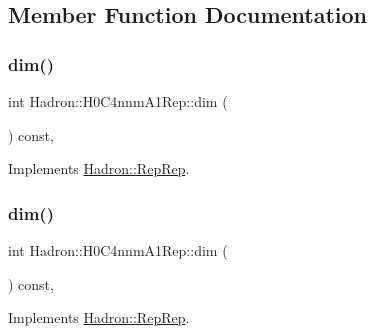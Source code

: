 \subsection{Member Function Documentation}
\mbox{\label{structHadron_1_1H0C4nnmA1Rep_a0457553b469cd5842e489112270a1d05}} 
\subsubsection{\texorpdfstring{dim()}{dim()}\hspace{0.1cm}{\footnotesize\ttfamily [1/5]}}
{\footnotesize\ttfamily int Hadron\+::\+H0\+C4nnm\+A1\+Rep\+::dim (\begin{DoxyParamCaption}{ }\end{DoxyParamCaption}) const\hspace{0.3cm}{\ttfamily [inline]}, {\ttfamily [virtual]}}



Implements \mbox{\hyperlink{structHadron_1_1RepRep_a92c8802e5ed7afd7da43ccfd5b7cd92b}{Hadron\+::\+Rep\+Rep}}.

\mbox{\label{structHadron_1_1H0C4nnmA1Rep_a0457553b469cd5842e489112270a1d05}} 
\subsubsection{\texorpdfstring{dim()}{dim()}\hspace{0.1cm}{\footnotesize\ttfamily [2/5]}}
{\footnotesize\ttfamily int Hadron\+::\+H0\+C4nnm\+A1\+Rep\+::dim (\begin{DoxyParamCaption}{ }\end{DoxyParamCaption}) const\hspace{0.3cm}{\ttfamily [inline]}, {\ttfamily [virtual]}}



Implements \mbox{\hyperlink{structHadron_1_1RepRep_a92c8802e5ed7afd7da43ccfd5b7cd92b}{Hadron\+::\+Rep\+Rep}}.

\mbox{\label{structHadron_1_1H0C4nnmA1Rep_a0457553b469cd5842e489112270a1d05}} 
